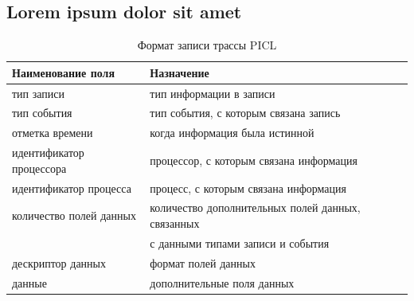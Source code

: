 \subsection{Lorem ipsum dolor sit amet}

\begin{table}[h!]
	\caption{\label{tab:tbl1}Формат записи трассы PICL}
	\begin{tabular}{|l|l|}
		\hline
		Наименование поля & Назначение \\
		\hline\hline
		тип записи&тип информации в записи
		\\\hline
		тип события &тип события, с которым связана запись
		\\\hline
		отметка времени&когда информация была истинной\\\hline
		идентификатор процессора
		&процессор, с которым связана информация
		\\\hline
		идентификатор процесса	
		&процесс, с которым связана информация	
		\\\hline
		количество полей данных	
		&количество дополнительных полей данных, связанных \tabularnewline & с данными типами записи и события	
		\\\hline
		дескриптор данных	
		&формат полей данных
		\\\hline
		данные	
		&дополнительные поля данных
		\\\hline
		
	\end{tabular}
\end{table}

